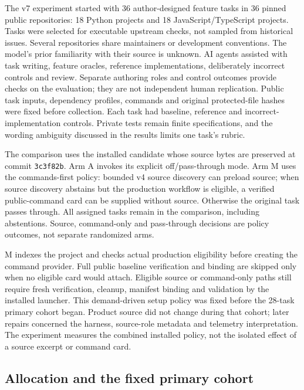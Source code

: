 \documentclass[manuscript,screen,nonacm]{acmart}
\begin{document}
The v7 experiment started with 36 author-designed feature tasks in 36
pinned public repositories: 18 Python projects and 18
JavaScript/TypeScript projects. Tasks were selected for executable
upstream checks, not sampled from historical issues. Several
repositories share maintainers or development conventions. The model's
prior familiarity with their source is unknown. AI agents assisted with
task writing, feature oracles, reference implementations, deliberately
incorrect controls and review. Separate authoring roles and control
outcomes provide checks on the evaluation; they are not independent
human replication. Public task inputs, dependency profiles, commands and
original protected-file hashes were fixed before collection. Each task
had baseline, reference and incorrect-implementation controls. Private
tests remain finite specifications, and the wording ambiguity discussed
in the results limits one task's rubric.

The comparison uses the installed candidate whose source bytes are
preserved at commit \texttt{3c3f82b}. Arm A invokes its explicit
off/pass-through mode. Arm M uses the commands-first policy: bounded v4
source discovery can preload source; when source discovery abstains but
the production workflow is eligible, a verified public-command card can
be supplied without source. Otherwise the original task passes through.
All assigned tasks remain in the comparison, including abstentions.
Source, command-only and pass-through decisions are policy outcomes, not
separate randomized arms.

M indexes the project and checks actual production eligibility before
creating the command provider. Full public baseline verification and
binding are skipped only when no eligible card would attach. Eligible
source or command-only paths still require fresh verification, cleanup,
manifest binding and validation by the installed launcher. This
demand-driven setup policy was fixed before the 28-task primary cohort
began. Product source did not change during that cohort; later repairs
concerned the harness, source-role metadata and telemetry
interpretation. The experiment measures the combined installed policy,
not the isolated effect of a source excerpt or command card.

\subsection{Allocation and the fixed primary
cohort}\label{allocation-and-the-fixed-primary-cohort}
\end{document}
